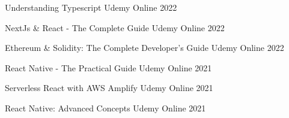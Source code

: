 

\begin{cvhonors}

  \cvhonor
    {Understanding Typescript} %
    {Udemy} %
    {Online} %
    {2022} %

  \cvhonor
    {NextJs \& React - The Complete Guide} %
    {Udemy} %
    {Online} %
    {2022} %

  \cvhonor
    {Ethereum \& Solidity: The Complete Developer's Guide} %
    {Udemy} %
    {Online} %
    {2022} %

  \cvhonor
    {React Native - The Practical Guide} %
    {Udemy} %
    {Online} %
    {2021} %

  \cvhonor
    {Serverless React with AWS Amplify} %
    {Udemy} %
    {Online} %
    {2021} %

  \cvhonor
    {React Native: Advanced Concepts} %
    {Udemy} %
    {Online} %
    {2021} %

\end{cvhonors}
